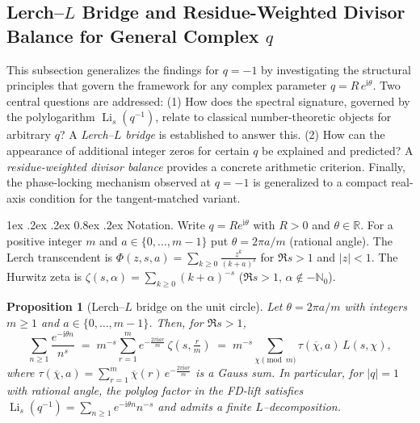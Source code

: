 \documentclass[11pt,a4paper]{amsart}
\makeatletter
\newcommand{\R}{\mathbb{R}}
\newcommand{\N}{\mathbb{N}}
\renewcommand\paragraph{\@startsection{paragraph}{4}{\z@}%
  {1ex \@plus .2ex \@minus .2ex}%
  {0.8ex \@plus .2ex}%
  {\normalfont\bfseries}}
\theoremstyle{plain}
\newtheorem{proposition}[theorem]{Proposition}
\theoremstyle{definition}
\theoremstyle{remark}
\makeatother
\begin{document}
\subsection{Lerch--\texorpdfstring{$L$}{L} Bridge and Residue-Weighted Divisor Balance for General Complex \texorpdfstring{$q$}{q}}
\label{subsec:lerch-L-bridge}

This subsection generalizes the findings for $q=-1$ by investigating the structural principles that govern the framework for any complex parameter $q=R\,e^{\mathrm{i}\theta}$. Two central questions are addressed: (1) How does the spectral signature, governed by the polylogarithm $\operatorname{Li}_s(q^{-1})$, relate to classical number-theoretic objects for arbitrary $q$? A \emph{Lerch--$L$ bridge} is established to answer this. (2) How can the appearance of additional integer zeros for certain $q$ be explained and predicted? A \emph{residue-weighted divisor balance} provides a concrete arithmetic criterion. Finally, the phase-locking mechanism observed at $q=-1$ is generalized to a compact real-axis condition for the tangent-matched variant.

\paragraph{Notation.}
Write $q=R e^{\mathrm{i}\theta}$ with $R>0$ and $\theta\in\R$.
For a positive integer $m$ and $a\in\{0,\dots,m-1\}$ put $\theta=2\pi a/m$ (rational angle).
The Lerch transcendent is $\Phi(z,s,a)=\sum_{k\ge0} \frac{z^{k}}{(k+a)^{s}}$ for $\Re s>1$ and
$|z|<1$. The Hurwitz zeta is $\zeta(s,\alpha)=\sum_{k\ge0} (k+\alpha)^{-s}$ ($\Re s>1$, $\alpha\notin -\N_0$).

\begin{proposition}[Lerch--$L$ bridge on the unit circle]
\label{prop:lerch-L-unit}
Let $\theta=2\pi a/m$ with integers $m\ge1$ and $a\in\{0,\dots,m-1\}$. Then, for $\Re s>1$,
\[
\sum_{n\ge1}\frac{e^{-\mathrm{i}\theta n}}{n^{s}}
\;=\; m^{-s}\sum_{r=1}^{m} e^{-\tfrac{2\pi \mathrm{i} a r}{m}}\,\zeta\!\left(s,\tfrac{r}{m}\right)
\;=\; m^{-s}\sum_{\chi\!\!\!\pmod m} \tau(\overline{\chi},a)\,L(s,\chi),
\]
where $\tau(\overline{\chi},a)=\sum_{r=1}^{m}\overline{\chi}(r)\,e^{-\tfrac{2\pi \mathrm{i} a r}{m}}$ is a Gauss sum.
\emph{In particular}, for $|q|=1$ with rational angle, the polylog factor in the FD-lift satisfies
$\operatorname{Li}_s(q^{-1})=\sum_{n\ge1} e^{-\mathrm{i}\theta n}n^{-s}$ and admits a finite $L$--decomposition.
\end{proposition}
\end{document}
